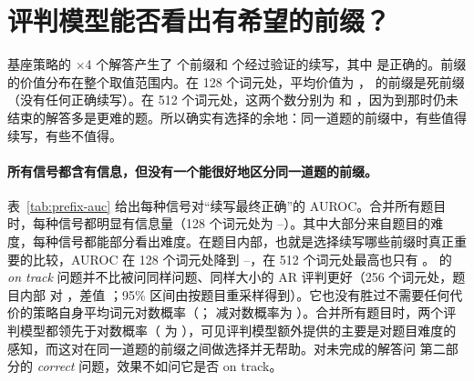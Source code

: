 
\section{评判模型能否看出有希望的前缀？}\label{sec:res-prefix}

基座策略的 $\times$4 个解答产生了  个前缀和  个经过验证的续写，其中  是正确的。前缀的价值分布在整个取值范围内。在 128 个词元处，平均价值为 ， 的前缀是死前缀（没有任何正确续写）。在 512 个词元处，这两个数分别为  和 ，因为到那时仍未结束的解答多是更难的题。所以确实有选择的余地：同一道题的前缀中，有些值得续写，有些不值得。

\paragraph{所有信号都含有信息，但没有一个能很好地区分同一道题的前缀。} 表~\ref{tab:prefix-auc} 给出每种信号对“续写最终正确”的 AUROC。合并所有题目时，每种信号都明显有信息量（128 个词元处为 --）。其中大部分来自题目的难度，每种信号都能部分看出难度。在题目内部，也就是选择续写哪些前缀时真正重要的比较，AUROC 在 128 个词元处降到 --，在 512 个词元处最高也只有 。\kev{} 的 \emph{on track} 问题并不比被问同样问题、同样大小的 AR 评判更好（256 个词元处，题目内部  对 ，差值  ；95\% 区间由按题目重采样得到）。它也没有胜过不需要任何代价的策略自身平均词元对数概率（；\kev{} 减对数概率为  ）。合并所有题目时，两个评判模型都领先于对数概率（\kev{} 为  ），可见评判模型额外提供的主要是对题目难度的感知，而这对在同一道题的前缀之间做选择并无帮助。对未完成的解答问 \kev{} 第二部分的 \emph{correct} 问题，效果不如问它是否 on track。

\begin{table}[t]
\centering\small

\caption{各信号按前缀长度预测“续写最终正确”的能力：合并所有前缀的 AUROC 和题目内部的 AUROC（同一道题中结果不同的续写对），以及与前缀蒙特卡洛价值的 Spearman 相关系数 $\rho$。500 道验证题，每题 4 个解答，每个前缀 4 次续写。}
\label{tab:prefix-auc}
\end{table}

